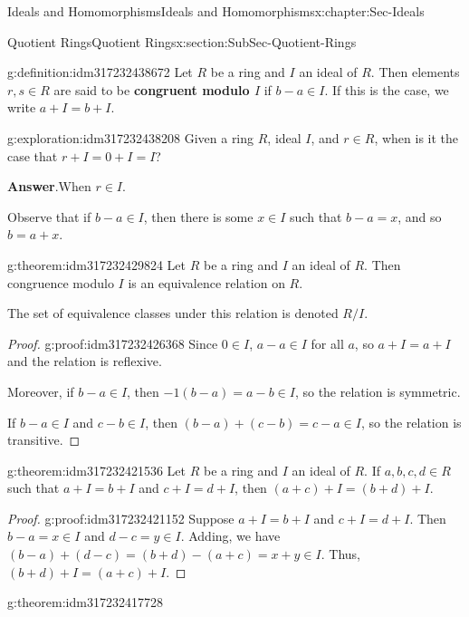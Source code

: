 \documentclass[oneside,10pt,]{book}
\newcommand{\blocktitlefont}{\relax}
\newcommand{\terminology}[1]{\textbf{#1}}
\numberwithin{equation}{section}
\begin{document}
\begin{chapterptx}{Ideals and Homomorphisms}{}{Ideals and Homomorphisms}{}{}{x:chapter:Sec-Ideals}
\typeout{************************************************}
%
\begin{sectionptx}{Quotient Rings}{}{Quotient Rings}{}{}{x:section:SubSec-Quotient-Rings}
\begin{definition}{}{g:definition:idm317232438672}%
Let \(R\) be a ring and \(I\) an ideal of \(R\). Then elements \(r,s\in R\) are said to be \terminology{congruent modulo \(I\)} if \(b-a\in I\). If this is the case, we write \(a + I = b + I\).%
\end{definition}
\begin{exploration}{}{g:exploration:idm317232438208}%
Given a ring \(R\), ideal \(I\), and \(r\in R\), when is it the case that \(r + I = 0 + I = I\)?%
\par\smallskip%
\noindent\textbf{\blocktitlefont Answer}.\hypertarget{g:answer:idm317232432464}{}\quad{}When \(r\in I\).%
\end{exploration}
Observe that if \(b-a \in I\), then there is some \(x\in I\) such that \(b-a = x\), and so \(b = a+x\).%
\begin{theorem}{}{}{g:theorem:idm317232429824}%
Let \(R\) be a ring and \(I\) an ideal of \(R\). Then congruence modulo \(I\) is an equivalence relation on \(R\).%
\end{theorem}
The set of equivalence classes under this relation is denoted \(R/I\).%
\begin{proof}{}{g:proof:idm317232426368}
Since \(0\in I\), \(a-a \in I\) for all \(a\), so \(a + I = a+I\) and the relation is reflexive.%
\par
Moreover, if \(b-a \in I\), then \(-1(b-a) = a-b \in I\), so the relation is symmetric.%
\par
If \(b-a \in I\) and \(c-b\in I\), then \((b-a) + (c-b) = c-a \in I\), so the relation is transitive.%
\end{proof}
\begin{theorem}{}{}{g:theorem:idm317232421536}%
Let \(R\) be a ring and \(I\) an ideal of \(R\). If \(a,b,c,d\in R\) such that \(a+I = b+I\) and \(c+I = d+I\), then \((a+c) + I = (b+d) + I\).%
\end{theorem}
\begin{proof}{}{g:proof:idm317232421152}
Suppose \(a+I = b+I\) and \(c+I = d+I\). Then \(b-a =x \in I\) and \(d-c = y \in I\). Adding, we have \((b-a) + (d-c) = (b+d) - (a+c) = x+y \in I\). Thus, \((b+d) + I = (a+c) + I\).%
\end{proof}
\begin{theorem}{}{}{g:theorem:idm317232417728}%

\end{theorem}
\end{sectionptx}
\end{chapterptx}
\end{document}
